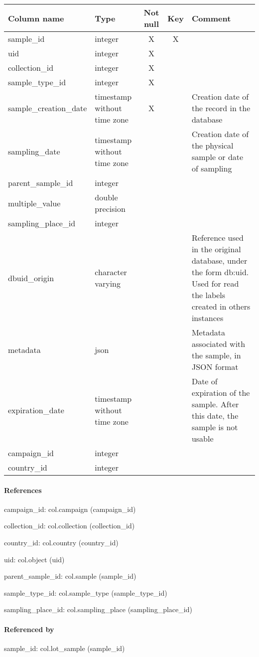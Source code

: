 \begin{tabular}{|l| p{2cm}|c|c| p{5cm}|}
\hline
Column name & Type & Not null & Key & Comment \\
\hline
sample\_id & integer & X & X & \\
uid & integer & X &  & \\
collection\_id & integer & X &  & \\
sample\_type\_id & integer & X &  & \\
sample\_creation\_date & timestamp without time zone & X &  & Creation date of the record in the database\\
sampling\_date & timestamp without time zone &  &  & Creation date of the physical sample or date of sampling\\
parent\_sample\_id & integer &  &  & \\
multiple\_value & double precision &  &  & \\
sampling\_place\_id & integer &  &  & \\
dbuid\_origin & character varying &  &  & Reference used in the original database, under the form db:uid. Used for read the labels created in others instances\\
metadata & json &  &  & Metadata associated with the sample, in JSON format\\
expiration\_date & timestamp without time zone &  &  & Date of expiration of the sample. After this date, the sample is not usable\\
campaign\_id & integer &  &  & \\
country\_id & integer &  &  & \\
\hline
\end{tabular}
\paragraph{References}
campaign\_id: col.campaign (campaign\_id)

collection\_id: col.collection (collection\_id)

country\_id: col.country (country\_id)

uid: col.object (uid)

parent\_sample\_id: col.sample (sample\_id)

sample\_type\_id: col.sample\_type (sample\_type\_id)

sampling\_place\_id: col.sampling\_place (sampling\_place\_id)

\paragraph{Referenced by}
sample\_id: col.lot\_sample (sample\_id)

